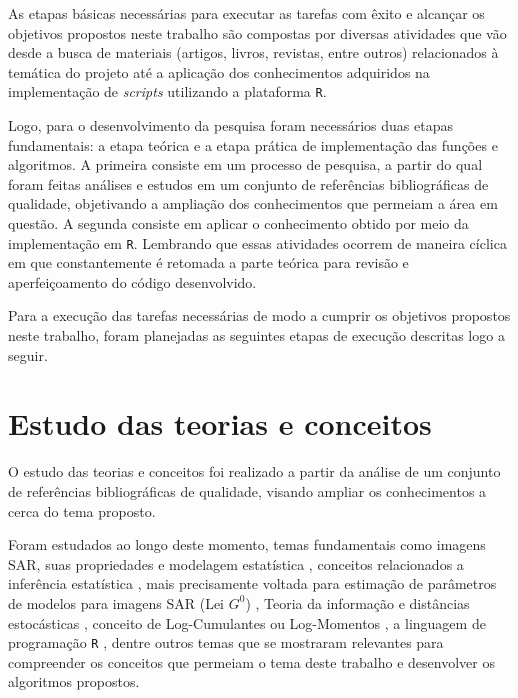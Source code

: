 
As etapas básicas necessárias para executar as tarefas com êxito e alcançar os objetivos propostos neste trabalho são compostas por diversas atividades que vão desde a busca de materiais (artigos, livros, revistas, entre outros) relacionados à temática do projeto até a aplicação dos conhecimentos adquiridos na implementação de \textit{scripts} utilizando a plataforma \texttt{R}.

Logo, para o desenvolvimento da pesquisa foram necessários duas etapas fundamentais: a etapa teórica e a etapa prática de implementação das funções e algoritmos. A primeira consiste em um processo de pesquisa, a partir do qual foram feitas análises e estudos em um conjunto de referências bibliográficas de qualidade, objetivando a ampliação dos conhecimentos que permeiam a área em questão. A segunda consiste em aplicar o conhecimento obtido por meio da implementação em \texttt{R}. Lembrando que essas atividades ocorrem de maneira cíclica em que constantemente é retomada a parte teórica para revisão e aperfeiçoamento do código desenvolvido.

Para a execução das tarefas necessárias de modo a cumprir os objetivos propostos neste trabalho, foram planejadas as seguintes etapas de execução descritas logo a seguir.

\section{Estudo das teorias e conceitos}

O estudo das teorias e conceitos foi realizado a partir da análise de um conjunto de referências bibliográficas de qualidade, visando ampliar os conhecimentos a cerca do tema proposto.

Foram estudados ao longo deste momento, temas fundamentais como imagens SAR, suas propriedades e modelagem estatística \citep{Gao2010StatisticalMO, Clutter1997, Mejail2002}, conceitos relacionados a inferência estatística \citep{CasellaBergerStatisticalInference}, mais precisamente voltada para estimação de parâmetros de modelos para imagens SAR (Lei $G^{0}$) \citep{FreryMinute2004,FreryStochasticDistances2015,Cassetti2013}, Teoria da informação e distâncias estocásticas \citep{StatisticalInferenceBasedonDivergenceMeasures,Shannon48}, conceito de Log-Cumulantes ou Log-Momentos \citep{nicolas2002,krylov2013}, a linguagem de programação \texttt{R} \citep{RCore}, dentre outros temas que se mostraram relevantes para compreender os conceitos que permeiam o tema deste trabalho e desenvolver os algoritmos propostos.

